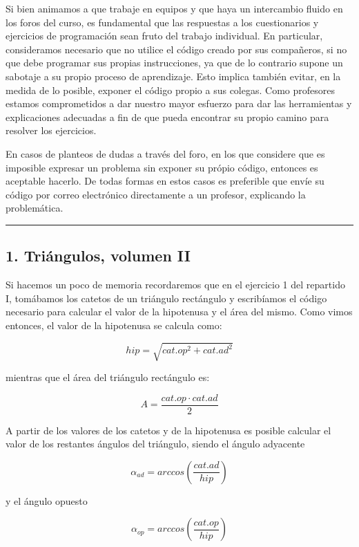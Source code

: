 \documentclass[]{article}
\begin{document}
Si bien animamos a que trabaje en equipos y que haya un intercambio
fluido en los foros del curso, es fundamental que las respuestas a los
cuestionarios y ejercicios de programación sean fruto del trabajo
individual. En particular, consideramos necesario que no utilice el
código creado por sus compañeros, si no que debe programar sus propias
instrucciones, ya que de lo contrario supone un sabotaje a su propio
proceso de aprendizaje. Esto implica también evitar, en la medida de lo
posible, exponer el código propio a sus colegas. Como profesores estamos
comprometidos a dar nuestro mayor esfuerzo para dar las herramientas y
explicaciones adecuadas a fin de que pueda encontrar su propio camino
para resolver los ejercicios.

En casos de planteos de dudas a través del foro, en los que considere
que es imposible expresar un problema sin exponer su própio código,
entonces es aceptable hacerlo. De todas formas en estos casos es
preferible que envíe su código por correo electrónico directamente a un
profesor, explicando la problemática.

\begin{center}\rule{3in}{0.4pt}\end{center}

\subsection{1. Triángulos, volumen II}

Si hacemos un poco de memoria recordaremos que en el ejercicio 1 del
repartido I, tomábamos los catetos de un triángulo rectángulo y
escribíamos el código necesario para calcular el valor de la hipotenusa
y el área del mismo. Como vimos entonces, el valor de la hipotenusa se
calcula como:

\[
  hip = \sqrt{cat.op ^ 2 + cat.ad ^ 2}
\]

mientras que el área del triángulo rectángulo es:

\[
  A = \frac{cat.op \cdot cat.ad}{2}
\]

A partir de los valores de los catetos y de la hipotenusa es posible
calcular el valor de los restantes ángulos del triángulo, siendo el
ángulo adyacente

\[
  \alpha_{ad} = arccos \left( \frac{cat.ad}{hip} \right)
\]

y el ángulo opuesto

\[
  \alpha_{op} = arccos \left( \frac{cat.op}{hip} \right)
\]
\end{document}
